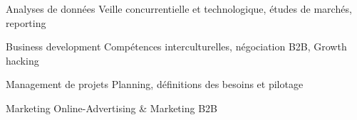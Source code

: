 

\begin{cvskills}
\cvskill
	{Analyses de données} %
	{Veille concurrentielle et technologique, études de marchés, reporting} %

  \cvskill
	{Business development} %
	{Compétences interculturelles, négociation B2B, Growth hacking} %
	
  \cvskill
	{Management de projets} %
	{Planning, définitions des besoins et pilotage} %

  \cvskill
	{Marketing} %
	{Online-Advertising \& Marketing B2B} %
\end{cvskills}
